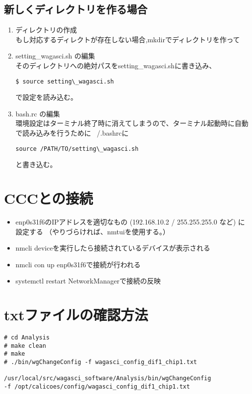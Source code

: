 \subsection{新しくディレクトリを作る場合}
\begin{enumerate}
\item ディレクトリの作成\\
もし対応するディレクトが存在しない場合,mkdirでディレクトリを作って

\item setting\_wagasci.sh の編集\\
そのディレクトリへの絶対パスをsetting\_wagasci.shに書き込み、
\begin{screen}
\begin{verbatim}
$ source setting\_wagasci.sh
\end{verbatim}
\end{screen}
で設定を読み込む。
\item bash.rc の編集\\
環境設定はターミナル終了時に消えてしまうので、ターミナル起動時に自動で読み込みを行うために ~/.bashrcに
\begin{screen}
\begin{verbatim}
source /PATH/TO/setting\_wagasci.sh
\end{verbatim}
\end{screen}
と書き込む。
\end{enumerate}

\newpage
\section{CCCとの接続}
\begin{itemize}
\item enp0s31f6のIPアドレスを適切なもの (192.168.10.2 / 255.255.255.0 など)  に設定する
（やりづらければ、nmtuiを使用する。）
\item nmcli deviceを実行したら接続されているデバイスが表示される
\item nmcli con up enp0s31f6で接続が行われる
\item systemctl restart NetworkManagerで接続の反映
\end{itemize}




\section{txtファイルの確認方法}

\begin{screen}
\begin{verbatim}
# cd Analysis
# make clean
# make
# ./bin/wgChangeConfig -f wagasci_config_dif1_chip1.txt

/usr/local/src/wagasci_software/Analysis/bin/wgChangeConfig 
-f /opt/calicoes/config/wagasci_config_dif1_chip1.txt 
\end{verbatim}
\end{screen}




